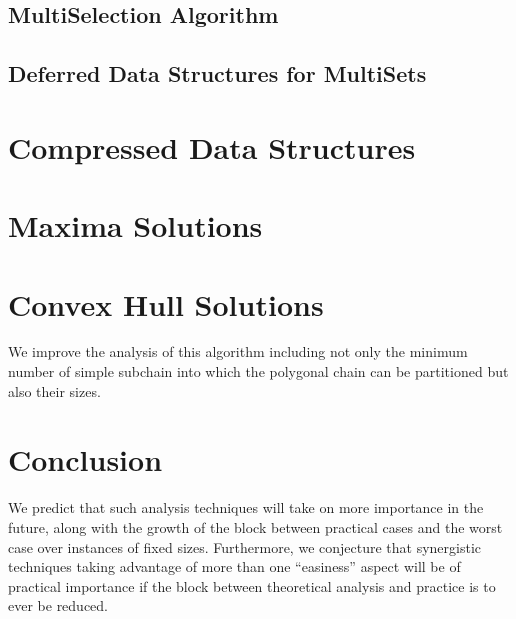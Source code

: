 \subsection{MultiSelection Algorithm}
\label{sec:multiselect}

\subsection{Deferred Data Structures for MultiSets}
\label{sec:dds}

\section{Compressed Data Structures}
\label{sec:compressed}

\section{Maxima Solutions}
\label{sec:maxima}

\section{Convex Hull Solutions}
\label{sec:hull}

We improve the analysis of this algorithm including not only the
minimum number of simple subchain into which the polygonal chain can
be partitioned but also their sizes.


\section{Conclusion}
\label{sec:con}

We predict that such analysis techniques will take on more importance
in the future, along with the growth of the block between practical
cases and the worst case over instances of fixed sizes. Furthermore,
we conjecture that synergistic techniques taking advantage of more
than one ``easiness'' aspect will be of practical importance if the
block between theoretical analysis and practice is to ever be reduced.

